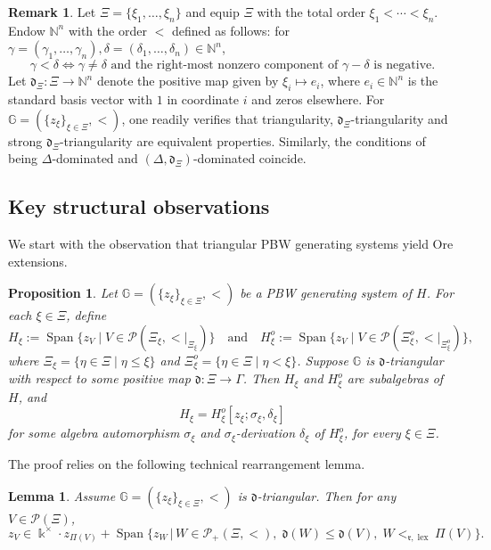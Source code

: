 \documentclass{article}
\theoremstyle{plain}
\newtheorem{prop}[thm]{Proposition}
\newtheorem{lemma}[thm]{Lemma}
\theoremstyle{definition}
\newtheorem{remark}[thm]{Remark}
\numberwithin{equation}{section}
\DeclareMathOperator{\Span}{Span}
\DeclareMathOperator{\lex}{lex}
\newcommand{\PP}{\mathcal{P}}
\newcommand{\GG}{\mathbb{G}}
\newcommand{\dd}{\mathfrak{d}}
\newcommand{\rr}{\mathfrak{r}}
\begin{document}
	\begin{remark}\label{right-lex-monoid}
		Let $\Xi=\{\xi_{1}, \ldots, \xi_{n}\}$ and equip $\Xi$ with the total order $\xi_{1} < \cdots < \xi_{n}$. Endow $\mathbb{N}^{n}$ with the order $<$ defined as follows: for $\gamma= (\gamma_{1},\ldots, \gamma_{n}), \delta =(\delta_{1},\ldots, \delta_{n})\in \mathbb{N}^{n}$,
		\[
		\gamma<\delta \Longleftrightarrow \gamma\neq \delta \text{ and the right-most nonzero component of $\gamma-\delta$ is negative}.
		\]
		Let $\dd_{\Xi}\colon\Xi\to \mathbb{N}^{n}$ denote the positive map given by $\xi_{i}\mapsto e_{i}$, where $e_{i}\in \mathbb{N}^{n}$ is the standard basis vector with $1$ in coordinate $i$ and zeros elsewhere. For $\GG=(\{z_{\xi}\}_{\xi\in \Xi}, <)$, one readily verifies that triangularity, $\dd_{\Xi}$-triangularity and strong $\dd_{\Xi}$-triangularity are equivalent properties. Similarly, the conditions of being $\Delta$-dominated and $(\Delta,\dd_{\Xi})$-dominated coincide.
	\end{remark}
	
	\subsection{Key structural observations}
	
	We start with the observation that triangular PBW generating systems yield Ore extensions.
	
	\begin{prop}\label{PBW-imply-IOE}
		Let $\GG=(\{z_{\xi}\}_{\xi\in \Xi}, <)$ be a PBW generating system of $H$. For each $\xi\in \Xi$, define
		\[
		H_{\xi}:= \Span\{z_{V}\mid V\in \PP(\Xi_{\xi}, {<}|_{\Xi_{\xi}} ) \} \quad \text{and} \quad H_{\xi}^{o}:= \Span\{z_{V}\mid V\in \PP(\Xi_{\xi}^{o}, {<}|_{\Xi_{\xi}^{o}}) \},
		\]
		where $\Xi_{\xi} = \{\eta\in \Xi \mid \eta\leq  \xi\}$ and $\Xi_{\xi}^{o} = \{\eta\in \Xi \mid \eta< \xi\}$. Suppose $\GG$ is $\dd$-triangular with respect to some positive map $\dd\colon\Xi\to \Gamma$. Then $H_{\xi}$ and $H_{\xi}^{o}$ are subalgebras of $H$, and $$H_{\xi} = H_{\xi}^{o}[z_{\xi}; \sigma_{\xi}, \delta_{\xi}]$$ for some algebra automorphism $\sigma_{\xi}$ and $\sigma_{\xi}$-derivation $\delta_{\xi}$ of $H_{\xi}^{o}$, for every $\xi\in \Xi$.
	\end{prop}
	
	The proof relies on the following technical rearrangement lemma.
	
	\begin{lemma}\label{rearrangement}
		Assume $\GG=(\{z_{\xi}\}_{\xi\in \Xi}, <)$ is $\dd$-triangular. Then for any $V\in \PP(\Xi)$,
		\[
		z_V \in \Bbbk^{\times} \cdot z_{\Pi(V)} +  \Span\big\{z_{W} \,\big|\, W \in \PP_{+}(\Xi, <),\; \dd(W) \leq \dd(V),\; W<_{\rr,\lex} \Pi(V) \big\}.
		\]
	\end{lemma}
	
\end{document}
